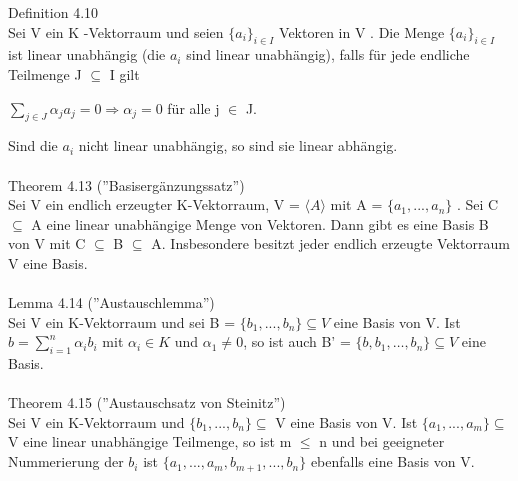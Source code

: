 \documentclass[fontsize=10pt]{scrartcl}
\begin{document}
Definition 4.10\\
Sei V ein K -Vektorraum und seien $\{a_i \}_{i \in I}$ Vektoren in V . Die Menge $\{a_i\}_{i \in I}$ ist linear unabhängig (die $a_i$ sind linear unabhängig), falls für jede endliche Teilmenge J $\subseteq$ I gilt
\begin{center}
$\sum\nolimits_{j \in J} \alpha_j a_j = 0 \Rightarrow \alpha_j = 0$ für alle j $\in$ J.
\end{center}
Sind die $a_i$ nicht linear unabhängig, so sind sie linear abhängig.\\ 
\\
Theorem 4.13 (”Basisergänzungssatz”)\\
Sei V ein endlich erzeugter K-Vektorraum, V = $\langle A \rangle$ mit A = $\{a_1,... ,a_n\}$ . Sei C $\subseteq$ A eine linear unabhängige Menge von Vektoren. Dann gibt es eine Basis B von V mit C $\subseteq$ B $\subseteq$ A. Insbesondere besitzt jeder endlich erzeugte Vektorraum V eine Basis.\\
\\
Lemma 4.14 (”Austauschlemma”)\\
Sei V ein K-Vektorraum und sei B = $\{b_1,... ,b_n\} \subseteq V$ eine Basis von V. Ist $b= \sum\nolimits_{i=1}^{n} \alpha_i b_i$ mit $\alpha_i \in K$ und $\alpha_1 \neq 0$, so ist auch B' = $\{ b, b_1, …, b_n \} \subseteq V$ eine Basis.\\
\\
Theorem 4.15 (”Austauschsatz von Steinitz”)\\
Sei V ein K-Vektorraum und $\{b_1,... ,b_n\} \subseteq$ V eine Basis von V. Ist $\{a_1,... ,a_m\} \subseteq$ V eine linear unabhängige Teilmenge, so ist m $\le$ n und bei geeigneter Nummerierung der $b_i$ ist $\{a_1,... ,a_m, b_{m+1},... ,b_n\}$ ebenfalls eine Basis von V. \\
\end{document}

